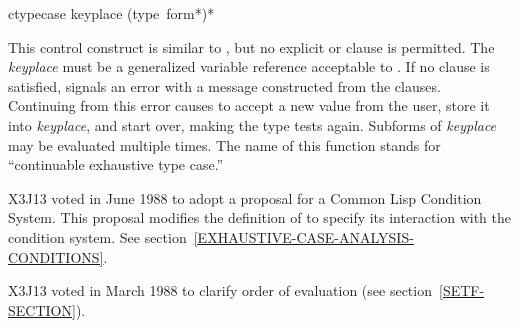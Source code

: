 \begin{defmac}
ctypecase keyplace {(type {\,form}*)}*

\begin{obsolete}\noindent
This control construct is similar to ,
but no explicit  or  clause is permitted.
The \emph{keyplace} must be a generalized variable reference
acceptable to .  If no clause is satisfied,  signals an
error with a message constructed from the clauses.  Continuing from this
error causes  to accept a new value from the user, store
it into \emph{keyplace}, and start over, making the type tests again.
Subforms of \emph{keyplace} may be evaluated multiple times.  The name
of this function stands for ``continuable exhaustive type case.''
\end{obsolete}

\begin{new}
X3J13 voted in June 1988
to adopt a proposal for a Common Lisp Condition System. 
This proposal modifies the definition of  to specify its
interaction with the condition system.
See section~\ref{EXHAUSTIVE-CASE-ANALYSIS-CONDITIONS}.
\end{new}

\begin{newer}
X3J13 voted in March 1988 
to clarify order of evaluation (see section~\ref{SETF-SECTION}).
\end{newer}
\end{defmac}

